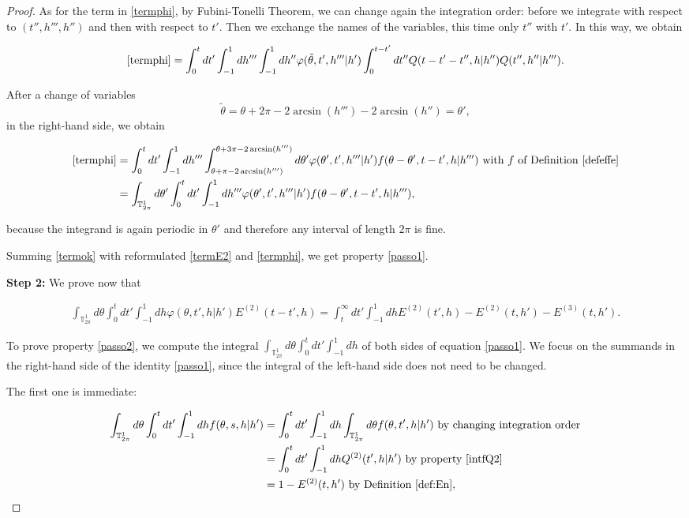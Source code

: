 \documentclass[a4paper,10pt,reqno]{amsart}
\numberwithin{equation}{subsection}
\numberwithin{figure}{subsection}
\begin{document}
\begin{proof}
As for the term in \eqref{termphi}, by Fubini-Tonelli Theorem, we can change again the integration order: before we integrate with respect to $(t'',h''',h'')$ and then with respect to $t'$. Then we exchange the names of the variables, this time only $t''$ with $t'$. In this way, we obtain

{\small\begin{align*}
\eqref{termphi}=\int_0^tdt'\int_{-1}^1dh'''\int_{-1}^1dh''\varphi(\tilde\theta,t',h'''|h')\int_0^{t-t'}dt''Q(t-t'-t'',h|h'')Q(t'',h''|h''').
\end{align*}}

After a change of variables
\[
\tilde\theta=\theta+2\pi-2\arcsin(h''')-2\arcsin(h'')=\theta',
\]
in the right-hand side, we obtain

{\tiny\begin{align*}
\eqref{termphi}&=\int_0^tdt'\int_{-1}^1dh'''\int_{\theta+\pi-2\arcsin(h''')}^{\theta+3\pi-2\arcsin(h''')}d\theta'\varphi(\theta',t',h'''|h')f(\theta-\theta',t-t',h|h''')\textrm{ with }f\textrm{ of Definition \ref{defeffe}}
\\
&=\int_{\mathbb{T}^1_{2\pi}}d\theta'\int_0^tdt'\int_{-1}^1dh'''\varphi(\theta',t',h'''|h')f(\theta-\theta',t-t',h|h'''),
\end{align*}}

because the integrand is again periodic in $\theta'$ and therefore any interval of length $2\pi$ is fine.

Summing \eqref{termok} with reformulated \eqref{termE2} and \eqref{termphi}, we get property \eqref{passo1}.

\textbf{Step 2:} We prove now that

{\scriptsize\begin{align}\label{passo2}
\int_{\mathbb{T}^1_{2\pi}}d\theta\int_0^tdt'\int_{-1}^1dh\varphi(\theta,t',h|h')E^{(2)}(t-t',h)
=\int_t^{\infty}dt'\int_{-1}^1dhE^{(2)}(t',h)-E^{(2)}(t,h')-E^{(3)}(t,h').
\end{align}}

To prove property \eqref{passo2}, we compute the integral $\int_{\mathbb{T}^1_{2\pi}}d\theta\int_0^tdt'\int_{-1}^1dh$ of both sides of equation \eqref{passo1}. We focus on the summands in the right-hand side of the identity \eqref{passo1}, since the integral of the left-hand side does not need to be changed.

The first one is immediate:

{\scriptsize\begin{align*}
\int_{\mathbb{T}^1_{2\pi}}d\theta\int_0^tdt'\int_{-1}^1dh f(\theta,s,h|h')&=\int_0^tdt'\int_{-1}^1dh\int_{\mathbb{T}^1_{2\pi}}d\theta f(\theta,t',h|h')\textrm{ by changing integration order}
\\
&=\int_0^tdt'\int_{-1}^1dhQ^{(2)}(t',h|h')\textrm{ by property \eqref{intfQ2}}
\\
&=1-E^{(2)}(t,h')\textrm{ by Definition }\ref{def:En},
\end{align*}}


\end{proof}
\end{document}
